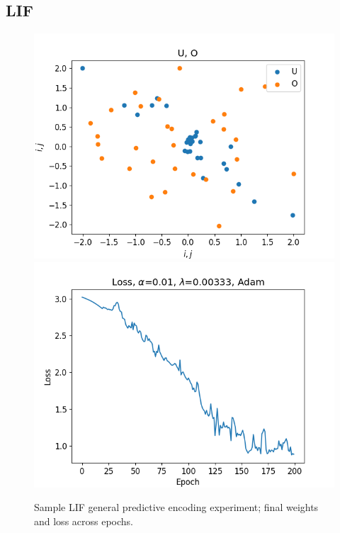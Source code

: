 \documentclass[mphil,deptreport,ianc]{infthesis} %
\begin{document}
\FloatBarrier

\subsection*{LIF}

\begin{figure}[!h]
    \centering
    \includegraphics[width=0.49\columnwidth]{figures/Supplementary/gating/LIF/GeneralPredictiveEncoding/01-04_16-46-28-427/_weights_O_U.png}
    \includegraphics[width=0.49\columnwidth]{figures/Supplementary/gating/LIF/GeneralPredictiveEncoding/01-04_16-46-28-427/plot_loss_test_mt_LIF_et_GeneralPredictiveEncoding_N_30_titers_200.png}
    \caption{Sample LIF general predictive encoding experiment; final weights and loss across epochs.}
    \label{fig:LIF_GPE_1_w_loss}
\end{figure}
\end{document}
